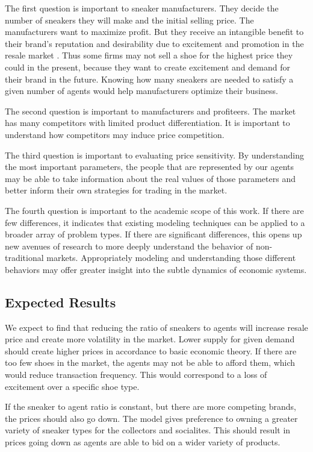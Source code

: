\documentclass[12pt]{article}
\begin{document}
The first question is important to sneaker manufacturers. They decide the number of sneakers they will make and the initial selling price. The manufacturers want to maximize profit. But they receive an intangible benefit to their brand's reputation and desirability due to excitement and promotion in the resale market  \cite{538}. Thus some firms may not sell a shoe for the highest price they could in the present, because they want to create excitement and demand for their brand in the future. Knowing how many sneakers are needed to satisfy a given number of agents would help manufacturers optimize their business.

The second question is important to manufacturers and profiteers. The market has many competitors with limited product differentiation. It is important to understand how competitors may induce price competition.

The third question is important to evaluating price sensitivity. By understanding the most important parameters, the people that are represented by our agents may be able to take information about the real values of those parameters and better inform their own strategies for trading in the market.

The fourth question is important to the academic scope of this work. If there are few differences, it indicates that existing modeling techniques can be applied to a broader array of problem types. If there are significant differences, this opens up new avenues of research to more deeply understand the behavior of non-traditional markets. Appropriately modeling and understanding those different behaviors may offer greater insight into the subtle dynamics of economic systems.

\subsection{Expected Results}
We expect to find that reducing the ratio of sneakers to agents will increase resale price and create more volatility in the market. Lower supply for given demand should create higher prices in accordance to basic economic theory. If there are too few shoes in the market, the agents may not be able to afford them, which would reduce transaction frequency. This would correspond to a loss of excitement over a specific shoe type.

If the sneaker to agent ratio is constant, but there are more competing brands, the prices should also go down. The model gives preference to owning a greater variety of sneaker types for the collectors and socialites. This should result in prices going down as agents are able to bid on a wider variety of products.
\end{document}
